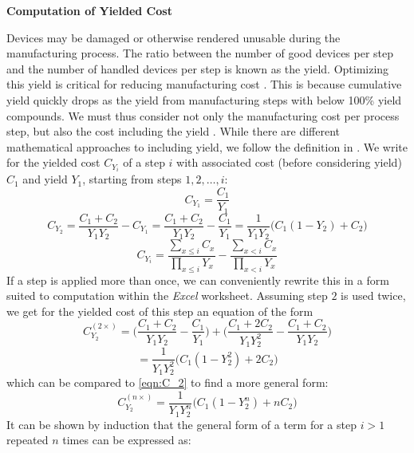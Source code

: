 \documentclass[parskip=full]{article}
\begin{document}
\textbf{Computation of Yielded Cost}

Devices may be damaged or otherwise rendered unusable during the manufacturing process. The ratio between the number of good devices per step and the number of handled devices per step is known as the yield. Optimizing this yield is critical for reducing manufacturing cost \cite{Kumar2006}. This is because cumulative yield quickly drops as the yield from manufacturing steps with below 100\% yield compounds. We must thus consider not only the manufacturing cost per process step, but also the cost including the yield \cite{becker2001use}\cite{becker2001using}. While there are different mathematical approaches to including yield, we follow the definition in \cite{becker2001use}. We write for the yielded cost $C_{Y_i}$ of a step $i$ with associated cost (before considering yield) $C_1$ and yield $Y_1$, starting from steps $1,2,\dots,i$:
%
\begin{equation}
\label{eqn:C_2}
    C_{Y_1} = \frac{C_1}{Y_1}
\end{equation}
\begin{equation}
    C_{Y_2} = \frac{C_1 + C_2}{Y_1 Y_2} - C_{Y_1} = \frac{C_1 + C_2}{Y_1 Y_2} - \frac{C_1}{Y_1} = \frac{1}{Y_1 Y_2} \bigg ( C_1 (1-Y_2) +C_2 \bigg)
\end{equation}
\begin{equation}
    C_{Y_i} = \frac{ \sum_{x \leq i} C_x }{ \prod_{x \leq i} Y_x } - \frac{ \sum_{x<i} C_x }{ \prod_{x<i} Y_x }
\end{equation}
%
If a step is applied more than once, we can conveniently rewrite this in a form suited to computation within the \textit{Excel} worksheet. Assuming step $2$ is used twice, we get for the yielded cost of this step an equation of the form
%
\begin{equation}
\label{eqn:C_2^2}
    C_{Y_2}^{(2 \times)} = \bigg( \frac{C_1 + C_2}{Y_1 Y_2} - \frac{C_1}{Y_1} \bigg) + \bigg( \frac{C_1 + 2 C_2}{Y_1 Y_2^2} - \frac{C_1 + C_2}{Y_1 Y_2}     \bigg)
\end{equation}
%
\begin{equation}
    = \frac{1}{Y_1 Y_2^2} \bigg( C_1 (1-Y_2^2) +2C_2 \bigg)
\end{equation}
%
which can be compared to  \cref{eqn:C_2} to find a more general form:
%
\begin{equation}
    C_{Y_2}^{(n \times)} = \frac{1}{Y_1 Y_2^n} \bigg( C_1 (1-Y_2^n)+nC_2\bigg)
\end{equation}
%
It can be shown by induction that the general form of a term for a step $i>1$ repeated $n$ times can be expressed as:
\end{document}
